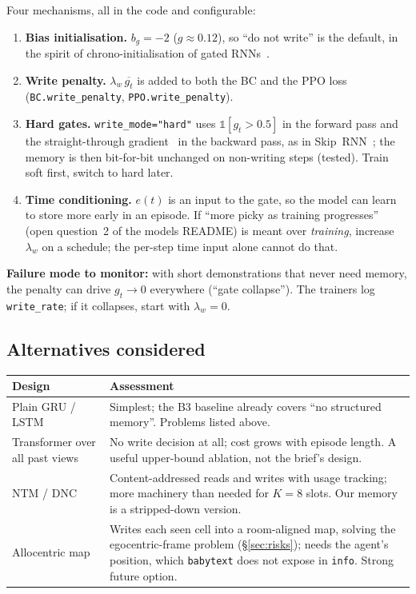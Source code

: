 \documentclass[11pt,a4paper]{article}
\newcommand{\code}[1]{\texttt{\small #1}}
\begin{document}
Four mechanisms, all in the code and configurable:
\begin{enumerate}
  \item \textbf{Bias initialisation.} $b_g = -2$ ($g \approx 0.12$), so ``do not write'' is the default, in the spirit
  of chrono-initialisation of gated RNNs~\cite{tallec2018chrono}.
  \item \textbf{Write penalty.} $\lambda_w\, \overline{g_t}$ is added to both the BC and the PPO loss
  (\code{BC.write\_penalty}, \code{PPO.write\_penalty}).
  \item \textbf{Hard gates.} \code{write\_mode="hard"} uses $\mathbb{1}[g_t > 0.5]$ in the forward pass and the
  straight-through gradient~\cite{bengio2013st} in the backward pass, as in Skip~RNN~\cite{campos2018skiprnn}; the
  memory is then bit-for-bit unchanged on non-writing steps (tested). Train soft first, switch to hard later.
  \item \textbf{Time conditioning.} $e(t)$ is an input to the gate, so the model can learn to store more early in an
  episode. If ``more picky as training progresses'' (open question~2 of the models README) is meant over \emph{training},
  increase $\lambda_w$ on a schedule; the per-step time input alone cannot do that.
\end{enumerate}
\textbf{Failure mode to monitor:} with short demonstrations that never need memory, the penalty can drive $g_t \to 0$
everywhere (``gate collapse''). The trainers log \code{write\_rate}; if it collapses, start with $\lambda_w = 0$.

\subsection{Alternatives considered}

\begin{center}
\small
\begin{tabularx}{\linewidth}{@{}>{\raggedright\arraybackslash}p{3.6cm}X@{}}
\toprule
Design & Assessment \\
\midrule
Plain GRU / LSTM~\cite{hochreiter1997lstm} & Simplest; the B3 baseline already covers ``no structured memory''. Problems listed above. \\
Transformer over all past views~\cite{parisotto2020gtrxl} & No write decision at all; cost grows with episode length. A useful upper-bound ablation, not the brief's design. \\
NTM / DNC~\cite{graves2014ntm,graves2016dnc} & Content-addressed reads and writes with usage tracking; more machinery than needed for $K{=}8$ slots. Our memory is a stripped-down version. \\
Allocentric map~\cite{parisotto2018neuralmap} & Writes each seen cell into a room-aligned map, solving the egocentric-frame problem (\S\ref{sec:risks}); needs the agent's position, which \code{babytext} does not expose in \code{info}. Strong future option. \\
\bottomrule
\end{tabularx}
\end{center}
\end{document}
